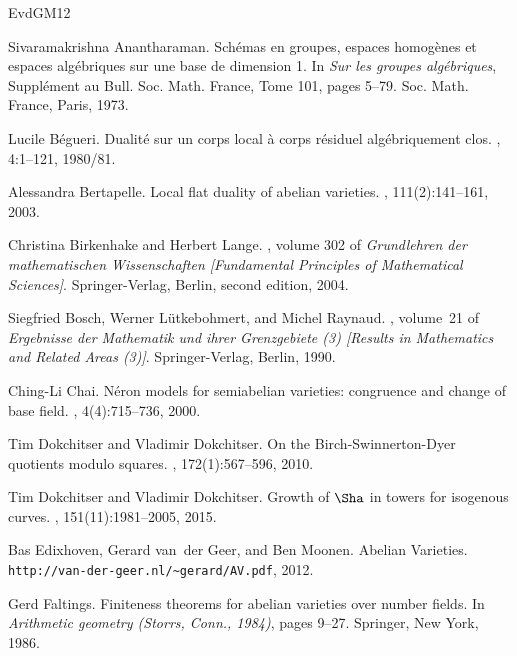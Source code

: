 \documentclass{amsart}
\theoremstyle{remark}
\numberwithin{equation}{section}
\begin{document}
\begin{thebibliography}{EvdGM12}

Sivaramakrishna Anantharaman.
\newblock Sch\'{e}mas en groupes, espaces homog\`enes et espaces
  alg\'{e}briques sur une base de dimension 1.
\newblock In {\em Sur les groupes alg\'{e}briques}, Suppl\'{e}ment au Bull.
  Soc. Math. France, Tome 101, pages 5--79. Soc. Math. France, Paris, 1973.

Lucile B{\'e}gueri.
\newblock Dualit\'{e} sur un corps local \`a corps r\'{e}siduel
  alg\'{e}briquement clos.
, 4:1--121, 1980/81.

Alessandra Bertapelle.
\newblock Local flat duality of abelian varieties.
, 111(2):141--161, 2003.

Christina Birkenhake and Herbert Lange.
, volume 302 of {\em Grundlehren der
  mathematischen Wissenschaften [Fundamental Principles of Mathematical
  Sciences]}.
\newblock Springer-Verlag, Berlin, second edition, 2004.

Siegfried Bosch, Werner L{\"u}tkebohmert, and Michel Raynaud.
, volume~21 of {\em Ergebnisse der Mathematik und
  ihrer Grenzgebiete (3) [Results in Mathematics and Related Areas (3)]}.
\newblock Springer-Verlag, Berlin, 1990.

Ching-Li Chai.
\newblock N\'{e}ron models for semiabelian varieties: congruence and change of
  base field.
, 4(4):715--736, 2000.

Tim Dokchitser and Vladimir Dokchitser.
\newblock On the {B}irch-{S}winnerton-{D}yer quotients modulo squares.
, 172(1):567--596, 2010.

Tim Dokchitser and Vladimir Dokchitser.
\newblock Growth of {$\Sha$} in towers for isogenous curves.
, 151(11):1981--2005, 2015.

Bas Edixhoven, Gerard van~der Geer, and Ben Moonen.
\newblock Abelian {V}arieties.
\newblock \verb+http://van-der-geer.nl/~gerard/AV.pdf+, 2012.

Gerd Faltings.
\newblock Finiteness theorems for abelian varieties over number fields.
\newblock In {\em Arithmetic geometry ({S}torrs, {C}onn., 1984)}, pages 9--27.
  Springer, New York, 1986.


\end{thebibliography}
\end{document}

